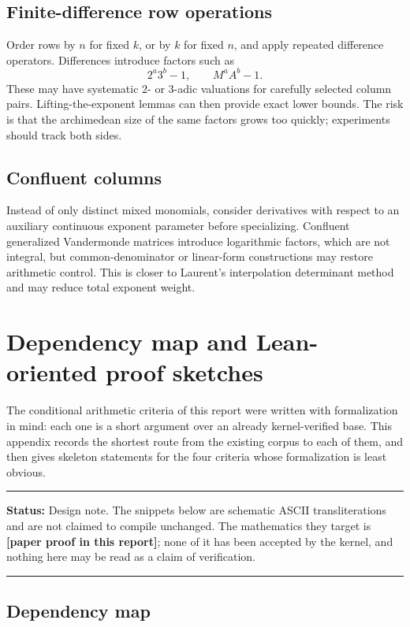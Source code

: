 \documentclass[11pt,oneside]{article}
\theoremstyle{definition}
\theoremstyle{remark}
\newcommand{\statusnew}{\textcolor{newgreen}{\textbf{[paper proof in this report]}}}
\newenvironment{statusbox}[1]
{\begin{center}\begin{minipage}{0.94\textwidth}\raggedright\hbadness=10000\hrule
\vspace{0.45em}\textbf{Status:} #1\par\vspace{0.35em}}
{\vspace{0.35em}\hrule\end{minipage}\end{center}}
\begin{document}
\subsection{Finite-difference row operations}

Order rows by $n$ for fixed $k$, or by $k$ for fixed $n$, and apply repeated difference
operators.  Differences introduce factors such as
\[
 2^a3^b-1,
 \qquad
 M^aA^b-1.
\]
These may have systematic $2$- or $3$-adic valuations for carefully selected column pairs.
Lifting-the-exponent lemmas can then provide exact lower bounds.  The risk is that the
archimedean size of the same factors grows too quickly; experiments should track both sides.

\subsection{Confluent columns}

Instead of only distinct mixed monomials, consider derivatives with respect to an auxiliary
continuous exponent parameter before specializing.  Confluent generalized Vandermonde
matrices introduce logarithmic factors, which are not integral, but common-denominator or
linear-form constructions may restore arithmetic control.  This is closer to Laurent's
interpolation determinant method \cite{Waldschmidt2000} and may reduce total exponent weight.

\section{Dependency map and Lean-oriented proof sketches}
\label{app:sketches}

The conditional arithmetic criteria of this report were written with formalization in mind:
each one is a short argument over an already kernel-verified base.  This appendix records the
shortest route from the existing corpus to each of them, and then gives skeleton statements
for the four criteria whose formalization is least obvious.

\begin{statusbox}{Design note.  The snippets below are schematic ASCII transliterations and
are not claimed to compile unchanged.  The mathematics they target is \statusnew{}; none of
it has been accepted by the kernel, and nothing here may be read as a claim of verification.}
\end{statusbox}

\subsection{Dependency map}
\label{a3:depmap}
\end{document}
